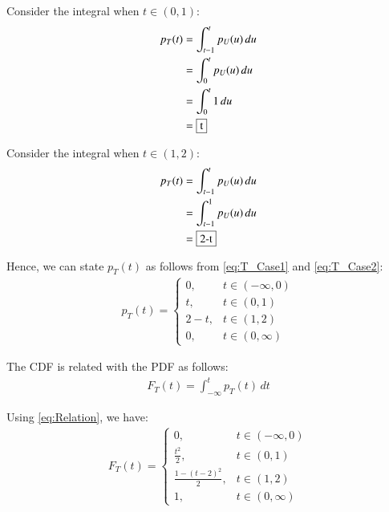 \documentclass[journal,12pt,twocolumn]{IEEEtran}
\renewcommand\thesection{\arabic{section}}
\begin{document}
\begin{enumerate}[label=\thesection.\arabic*
,ref=\thesection.\theenumi]
	Consider the integral when $t \in (0, 1)$:
	\begin{align}
		p_T(t) &= \int_{t-1}^{t} p_U(u) \,du \\
		&= \int_{0}^{t} p_U(u) \,du \\
		&= \int_{0}^{t} 1 \,du \\
		&= \fbox{t}
		\label{eq:T_Case1}
	\end{align}

	Consider the integral when $t \in (1, 2)$:
	\begin{align}
		p_T(t) &= \int_{t-1}^{t} p_U(u) \,du \\
		&= \int_{t-1}^{1} p_U(u) \,du \\
		&= \fbox{2-t}
		\label{eq:T_Case2}
	\end{align}

	Hence, we can state $p_T(t)$ as follows from \eqref{eq:T_Case1} and \eqref{eq:T_Case2}:
	\begin{align}
		p_T(t) =
		\begin{cases}
			0, & t \in (-\infty, 0) \\
			t, & t \in (0, 1) \\
			2 - t, & t \in (1, 2) \\
			0, & t \in (0, \infty)
		\end{cases}
		\label{eq:T_PDF}
	\end{align}

	The CDF is related with the PDF as follows:
	\begin{align}
		F_T(t) = \int_{-\infty}^{t} p_T(t) \,dt
		\label{eq:Relation}
	\end{align}

	Using \eqref{eq:Relation}, we have:
	\begin{align}
		F_T(t) =
		\begin{cases}
			0, & t \in (-\infty, 0) \\
			\frac{t^2}{2}, & t \in (0, 1) \\
			\frac{1 - (t-2)^2}{2}, & t \in (1, 2) \\
			1, &t \in (0, \infty)
		\end{cases}
		\label{eq:T_CDF}
	\end{align}


\end{enumerate}
\end{document}
